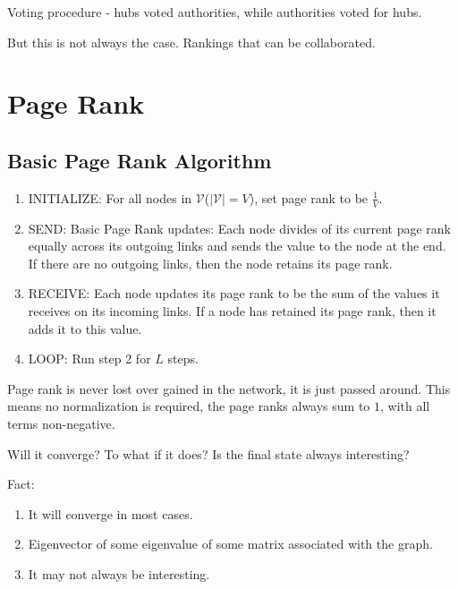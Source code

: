 \begin{prev}
	Voting procedure - hubs voted authorities, while authorities voted for hubs.
\end{prev}

But this is not always the case. Rankings that can be collaborated.

\chapter{Page Rank}
\section{Basic Page Rank Algorithm}
\begin{enumerate}
	\item INITIALIZE: For all nodes in \(\mathcal{V}\)(\(\left\vert \mathcal{V} \right\vert = V\)),
	      set page rank to be \(\frac{1}{V}\).
	\item SEND: Basic Page Rank updates: Each node divides of its current page rank equally across its outgoing
	      links and sends the value to the node at the end. If there are no outgoing links, then the node retains its page rank.
	\item RECEIVE: Each node updates its page rank to be the sum of the values it receives on its incoming links. If
	      a node has retained its page rank, then it adds it to this value.
	\item LOOP: Run step 2 for \(L\) steps.
\end{enumerate}
\begin{note}
	Page rank is never lost over gained in the network, it is just passed around. This means no normalization is required,
	the page ranks always sum to \(1\), with all terms non-negative.
\end{note}

\begin{problem}
Will it converge? To what if it does? Is the final state always interesting?
\end{problem}
\begin{answer}
	Fact: \begin{enumerate}
		\item It will converge in most cases.
		\item Eigenvector of some eigenvalue of some matrix associated with the graph.
		\item It may not always be interesting.
	\end{enumerate}
\end{answer}

